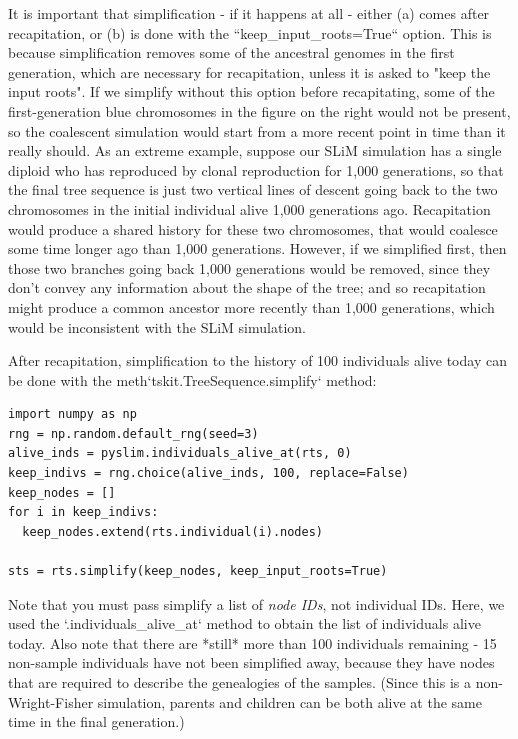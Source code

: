 \documentclass[12pt]{article}
\begin{document}
It is important that simplification - if it happens at all -
either (a) comes after recapitation, or (b) is done with the
``keep\_input\_roots=True`` option.
This is because simplification removes some of the
ancestral genomes in the first generation,
which are necessary for recapitation,
unless it is asked to "keep the input roots".
If we simplify without this option before recapitating,
some of the first-generation blue chromosomes in the figure on the right
would not be present, so the coalescent simulation would start from a more recent point in time
than it really should.
As an extreme example, suppose our SLiM simulation has a single diploid who has reproduced
by clonal reproduction for 1,000 generations,
so that the final tree sequence is just two vertical lines of descent going back
to the two chromosomes in the initial individual alive 1,000 generations ago.
Recapitation would produce a shared history for these two chromosomes,
that would coalesce some time longer ago than 1,000 generations.
However, if we simplified first, then those two branches going back 1,000 generations would be removed,
since they don't convey any information about the shape of the tree;
and so recapitation might produce a common ancestor more recently than 1,000 generations,
which would be inconsistent with the SLiM simulation.

After recapitation,
simplification to the history of 100 individuals alive today
can be done with the {meth}`tskit.TreeSequence.simplify` method:
\begin{verbatim}
import numpy as np
rng = np.random.default_rng(seed=3)
alive_inds = pyslim.individuals_alive_at(rts, 0)
keep_indivs = rng.choice(alive_inds, 100, replace=False)
keep_nodes = []
for i in keep_indivs:
  keep_nodes.extend(rts.individual(i).nodes)

sts = rts.simplify(keep_nodes, keep_input_roots=True)
\end{verbatim}

Note that you must pass simplify a list of \textit{node IDs}, not individual IDs.
Here, we used the `.individuals\_alive\_at` method to obtain the list
of individuals alive today.
Also note that there are *still* more than 100 individuals remaining - 15 non-sample individuals
have not been simplified away,
because they have nodes that are required to describe the genealogies of the samples.
(Since this is a non-Wright-Fisher simulation,
parents and children can be both alive at the same time in the final generation.)
\end{document}
